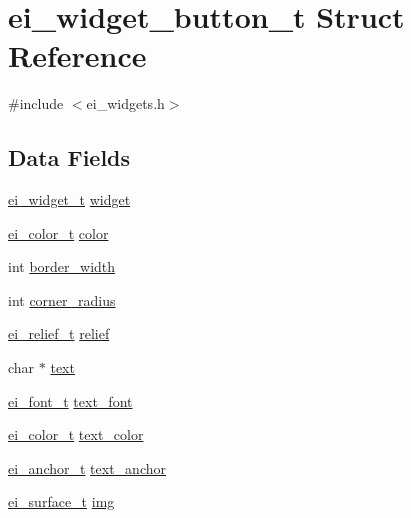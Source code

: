 \hypertarget{structei__widget__button__t}{\section{ei\-\_\-widget\-\_\-button\-\_\-t Struct Reference}
\label{structei__widget__button__t}
}


{\ttfamily \#include $<$ei\-\_\-widgets.\-h$>$}

\subsection*{Data Fields}
\begin{DoxyCompactItemize}
\item 
\hyperlink{structei__widget__t}{ei\-\_\-widget\-\_\-t} \hyperlink{structei__widget__button__t_acf769e84e4a3cd0201c019998850deef}{widget}
\item 
\hyperlink{structei__color__t}{ei\-\_\-color\-\_\-t} \hyperlink{structei__widget__button__t_a9fb4cdb0541591221c5dcfc88dc869b9}{color}
\item 
int \hyperlink{structei__widget__button__t_a6bcd339f4094c369a4542e71dcd46ae6}{border\-\_\-width}
\item 
int \hyperlink{structei__widget__button__t_a34822359cc6bd4a196b9ccc545441748}{corner\-\_\-radius}
\item 
\hyperlink{ei__types_8h_aa79a32b1d8ece0e44cfa394e870b270b}{ei\-\_\-relief\-\_\-t} \hyperlink{structei__widget__button__t_a96c4fa4a563064cc4cb67066fbbddc2b}{relief}
\item 
char $\ast$ \hyperlink{structei__widget__button__t_a3baa34b73437e99f2f0e162351a3ba84}{text}
\item 
\hyperlink{ei__types_8h_a22c8198e4d641e4bc67bb17f9c6bcda7}{ei\-\_\-font\-\_\-t} \hyperlink{structei__widget__button__t_ad619e741a38f68fda98a9c9405225123}{text\-\_\-font}
\item 
\hyperlink{structei__color__t}{ei\-\_\-color\-\_\-t} \hyperlink{structei__widget__button__t_a938724ea59ccdfbcbada1b237ad14640}{text\-\_\-color}
\item 
\hyperlink{ei__types_8h_a3852c963af609d31d7cfcff79c4c8450}{ei\-\_\-anchor\-\_\-t} \hyperlink{structei__widget__button__t_a2897e23a54ab047beb6203d835191e8e}{text\-\_\-anchor}
\item 
\hyperlink{hw__interface_8h_ad9970ae727c438faaf09c58c5defb796}{ei\-\_\-surface\-\_\-t} \hyperlink{structei__widget__button__t_a6bae8ac3b27a453f7a56299a2ed58ac7}{img}

\end{DoxyCompactItemize}
